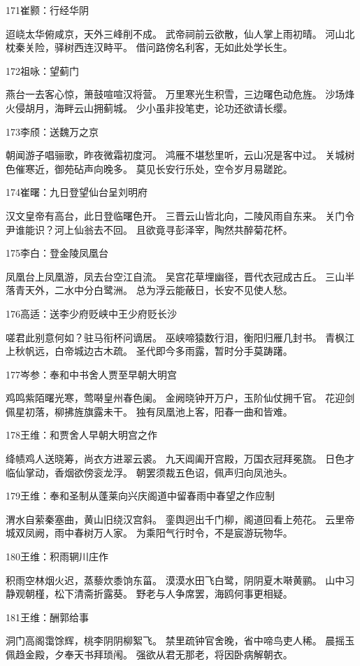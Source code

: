 171崔颢：行经华阴

迢峣太华俯咸京，天外三峰削不成。
武帝祠前云欲散，仙人掌上雨初晴。
河山北枕秦关险，驿树西连汉畤平。
借问路傍名利客，无如此处学长生。

172祖咏：望蓟门

燕台一去客心惊，箫鼓喧喧汉将营。
万里寒光生积雪，三边曙色动危旌。
沙场烽火侵胡月，海畔云山拥蓟城。
少小虽非投笔吏，论功还欲请长缨。

173李颀：送魏万之京

朝闻游子唱骊歌，昨夜微霜初度河。
鸿雁不堪愁里听，云山况是客中过。
关城树色催寒近，御苑砧声向晚多。
莫见长安行乐处，空令岁月易蹉跎。

174崔曙：九日登望仙台呈刘明府

汉文皇帝有高台，此日登临曙色开。
三晋云山皆北向，二陵风雨自东来。
关门令尹谁能识？河上仙翁去不回。
且欲竟寻彭泽宰，陶然共醉菊花杯。

175李白：登金陵凤凰台

凤凰台上凤凰游，凤去台空江自流。
吴宫花草埋幽径，晋代衣冠成古丘。
三山半落青天外，二水中分白鹭洲。
总为浮云能蔽日，长安不见使人愁。

176高适：送李少府贬峡中王少府贬长沙

嗟君此别意何如？驻马衔杯问谪居。
巫峡啼猿数行泪，衡阳归雁几封书。
青枫江上秋帆远，白帝城边古木疏。
圣代即今多雨露，暂时分手莫踌躇。

177岑参：奉和中书舍人贾至早朝大明宫

鸡鸣紫陌曙光寒，莺啭皇州春色阑。
金阙晓钟开万户，玉阶仙仗拥千官。
花迎剑佩星初落，柳拂旌旗露未干。
独有凤凰池上客，阳春一曲和皆难。

178王维：和贾舍人早朝大明宫之作

绛帻鸡人送晓筹，尚衣方进翠云裘。
九天阊阖开宫殿，万国衣冠拜冕旒。
日色才临仙掌动，香烟欲傍衮龙浮。
朝罢须裁五色诏，佩声归向凤池头。

179王维：奉和圣制从蓬莱向兴庆阁道中留春雨中春望之作应制

渭水自萦秦塞曲，黄山旧绕汉宫斜。
銮舆迥出千门柳，阁道回看上苑花。
云里帝城双凤阙，雨中春树万人家。
为乘阳气行时令，不是宸游玩物华。

180王维：积雨辋川庄作

积雨空林烟火迟，蒸藜炊黍饷东菑。
漠漠水田飞白鹭，阴阴夏木啭黄鹂。
山中习静观朝槿，松下清斋折露葵。
野老与人争席罢，海鸥何事更相疑。

181王维：酬郭给事

洞门高阁霭馀辉，桃李阴阴柳絮飞。
禁里疏钟官舍晚，省中啼鸟吏人稀。
晨摇玉佩趋金殿，夕奉天书拜琐闱。
强欲从君无那老，将因卧病解朝衣。

